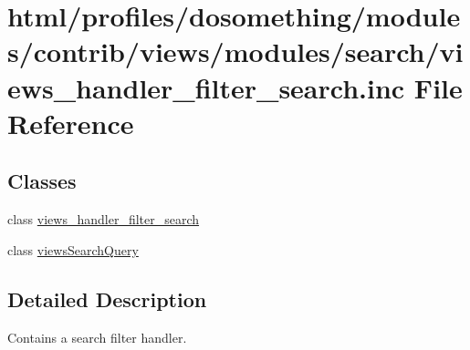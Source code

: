 \hypertarget{views__handler__filter__search_8inc}{
\section{html/profiles/dosomething/modules/contrib/views/modules/search/views\_\-handler\_\-filter\_\-search.inc File Reference}
\label{views__handler__filter__search_8inc}
}
\subsection*{Classes}
\begin{DoxyCompactItemize}
\item 
class \hyperlink{classviews__handler__filter__search}{views\_\-handler\_\-filter\_\-search}
\item 
class \hyperlink{classviewsSearchQuery}{viewsSearchQuery}
\end{DoxyCompactItemize}


\subsection{Detailed Description}
Contains a search filter handler. 